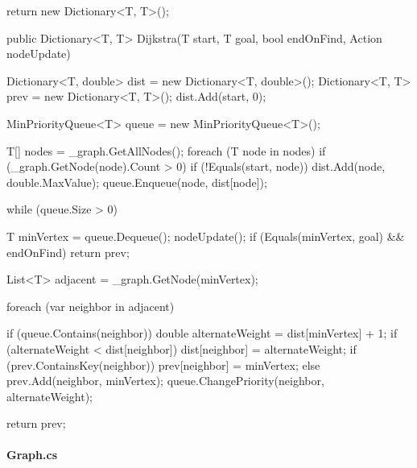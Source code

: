 \begin{flushleft}
\begin{cscode}
{{        return new Dictionary<T, T>();
    }

    public Dictionary<T, T> Dijkstra(T start, T goal, bool endOnFind, Action nodeUpdate)
    {
        Dictionary<T, double> dist = new Dictionary<T, double>();
        Dictionary<T, T> prev = new Dictionary<T, T>();
        dist.Add(start, 0);

        MinPriorityQueue<T> queue = new MinPriorityQueue<T>();

        T[] nodes = _graph.GetAllNodes();
        foreach (T node in nodes)
        {
            if (_graph.GetNode(node).Count > 0)
            {
                if (!Equals(start, node)) dist.Add(node, double.MaxValue);
                queue.Enqueue(node, dist[node]);
            }
        }

        while (queue.Size > 0)
        {
            T minVertex = queue.Dequeue();
            nodeUpdate();
            if (Equals(minVertex, goal) && endOnFind) return prev;

            List<T> adjacent = _graph.GetNode(minVertex);

            foreach (var neighbor in adjacent)
            {

                if (queue.Contains(neighbor))
                {
                    double alternateWeight = dist[minVertex] + 1;
                    if (alternateWeight < dist[neighbor])
                    {
                        dist[neighbor] = alternateWeight;
                        if (prev.ContainsKey(neighbor)) prev[neighbor] = minVertex;
                        else prev.Add(neighbor, minVertex);
                        queue.ChangePriority(neighbor, alternateWeight);
                    }
                }
            }
        }

        return prev;
    }
}
    \end{cscode}

    \paragraph{Graph.cs}
\end{flushleft}
